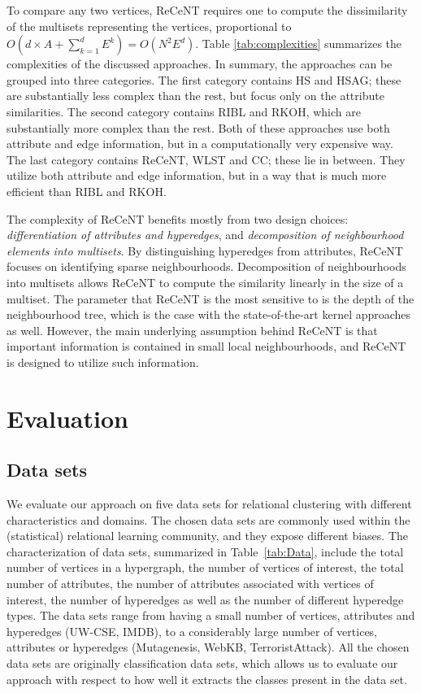 To compare any two vertices, ReCeNT requires one to compute the dissimilarity of the multisets representing the vertices, proportional to $O(d\times A + \sum_{k=1}^d E^k) = O\left (N^2 E^d \right )$.
Table \ref{tab:complexities} summarizes the complexities of the discussed approaches.
In summary, the approaches can be grouped into three categories.
The first category contains HS and HSAG; these are substantially less complex than the rest, but focus only on the attribute similarities.
The second category contains RIBL and RKOH, which are substantially more complex than the rest.
Both of these approaches use both attribute and edge information, but in a computationally very expensive way.
The last category contains ReCeNT, WLST and CC; these lie in between. They utilize both attribute and edge information, but in a way that is much more efficient than RIBL and RKOH.




The complexity of ReCeNT benefits mostly from two design choices: \textit{differentiation of attributes and hyperedges}, and \textit{decomposition of neighbourhood elements into multisets}.
By distinguishing hyperedges from attributes, ReCeNT focuses on identifying sparse neighbourhoods.
Decomposition of neighbourhoods into multisets allows ReCeNT to compute the similarity linearly in the size of a multiset.
The parameter that ReCeNT is the most sensitive to is the depth of the neighbourhood tree, which is the case with the state-of-the-art kernel approaches as well.
However, the main underlying assumption behind ReCeNT is that important information is contained in small local neighbourhoods, and ReCeNT is designed to utilize such information.


\section{Evaluation}
\label{sec:Evaluation}



\subsection{Data sets}



We evaluate our approach on five data sets for relational clustering with different characteristics and domains.
The chosen data sets are commonly used within the (statistical) relational learning community, and they expose different biases.
The characterization of data sets, summarized in Table~\ref{tab:Data}, include the total number of vertices in a hypergraph, the number of vertices of interest, the total number of attributes, the number of attributes associated with vertices of interest, the number of hyperedges as well as the number of different hyperedge types.
The data sets range from having a small number of vertices, attributes and hyperedges (UW-CSE, IMDB), to a considerably large number of vertices, attributes or hyperedges (Mutagenesis, WebKB, TerroristAttack).
All the chosen data sets are originally classification data sets, which allows us to evaluate our approach with respect to how well it extracts the classes present in the data set.





